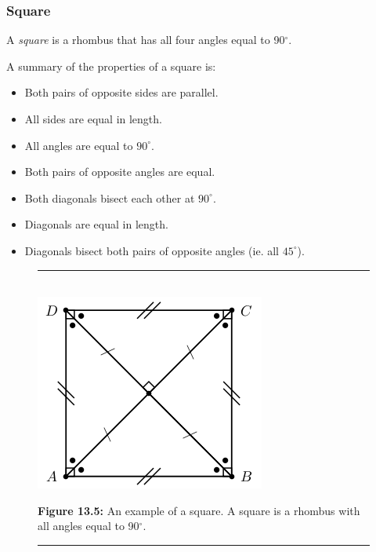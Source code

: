             \subsubsection{ Square}
            \nopagebreak
          \label{m39354*id319154}A \textsl{square} is a rhombus that has all four angles equal to 90${}^{\circ }$.\par 
          \label{m39354*id319177}A summary of the properties of a square is:\par 
          \label{m39354*id319181}\begin{itemize}[noitemsep]
            \label{m39354*uid77}\item Both pairs of opposite sides are parallel.
\label{m39354*uid78}\item All sides are equal in length.
\label{m39354*uid79}\item All angles are equal to ${90}^{\circ }$.
\label{m39354*uid80}\item Both pairs of opposite angles are equal.
\label{m39354*uid81}\item Both diagonals bisect each other at ${90}^{\circ }$.
\label{m39354*uid82}\item Diagonals are equal in length.
\label{m39354*uid83}\item Diagonals bisect both pairs of opposite angles (ie. all ${45}^{\circ }$).
\end{itemize}
    \setcounter{subfigure}{0}
	\begin{figure}[H] %
    \begin{center}
    \rule[.1in]{\figurerulewidth}{.005in} \\
        \label{m39354*uid84!!!underscore!!!media}\label{m39354*uid84!!!underscore!!!printright prismsimage}\includegraphics{col11306.imgs/m39354_MG10C13_044.png} %
      \vspace{2pt}
    \vspace{\rubberspace}\par \begin{cnxcaption}
	  \small \textbf{Figure 13.5: }An example of a square. A square is a rhombus with all angles equal to 90${}^{\circ }$.
	\end{cnxcaption}
    \vspace{.1in}
    \rule[.1in]{\figurerulewidth}{.005in} \\
    \end{center}
 \end{figure}       
        \label{m39354*uid85}
